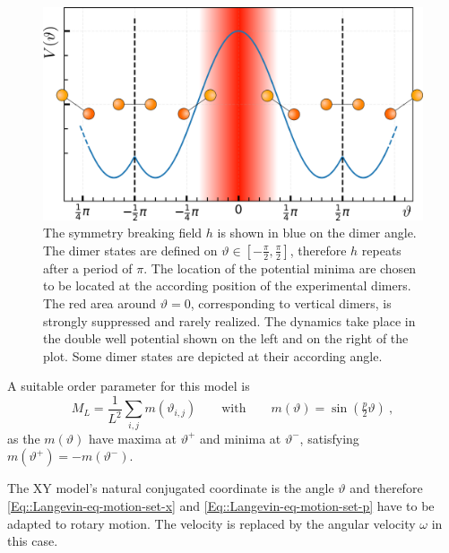 	\begin{figure}[thb]
		\centering
		\includegraphics[width=0.8\linewidth]{graphics/XY-Silicon-potential2.png}
		\caption{The symmetry breaking field $h$ is shown in blue on the dimer angle. The dimer states are defined on $\vartheta \in [-\tfrac{\pi}{2}, \tfrac{\pi}{2}]$, therefore $h$ repeats after a period of $\pi$. The location of the potential minima are chosen to be located at the according position of the experimental dimers. The red area around $\vartheta =	0$, corresponding to vertical dimers, is strongly suppressed and rarely realized. The dynamics take place in the double well potential shown on the left and on the right of the plot. Some dimer states are depicted at their according angle.}
		\label{Fig::XY-Silicon-Potential}
	\end{figure}
	A suitable order parameter for this model is
	\begin{equation} \label{Eq::Si-Order-Param}
		M_L =	\frac{1}{L^2} \sum_{i,j} m(\vartheta_{i, j}) \qquad \text{with} \qquad	m(\vartheta) =	\sin \left(\tfrac{p}{2} \vartheta\right) ~,
	\end{equation}
	as the $m(\vartheta)$ have maxima at $\vartheta^{+}$ and minima at $\vartheta^{-}$, satisfying $m(\vartheta^+) =	- m (\vartheta^-)$.
	
	The XY model's natural conjugated coordinate is the angle $\vartheta$ and therefore \autoref{Eq::Langevin-eq-motion-set-x} and \autoref{Eq::Langevin-eq-motion-set-p} have to be adapted to rotary motion. The velocity is replaced by the angular velocity $\omega$ in this case.
	
